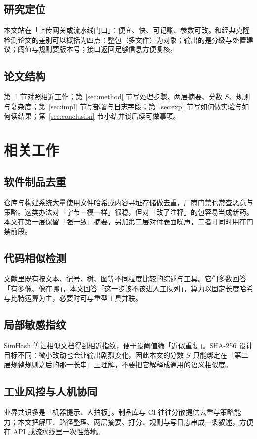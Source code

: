 \documentclass[UTF8,a4paper,zihao=5]{ctexart}
\begin{document}
\subsection{研究定位}
本文站在「上传网关或流水线门口」：便宜、快、可记账、参数可改。和经典克隆检测论文的差别可以概括为四点：整包（多文件）为对象；输出的是分级与处置建议；阈值与规则要版本号；接口返回足够信息方便复核。

\subsection{论文结构}
第~\ref{sec:related} 节对照相近工作；第~\ref{sec:method} 节写处理步骤、两层摘要、分数 $S$、规则与复杂度；第~\ref{sec:impl} 节写部署与日志字段；第~\ref{sec:exp} 节写如何做实验与如何读结果；第~\ref{sec:conclusion} 节小结并谈后续可做事项。

\section{相关工作}
\label{sec:related}

\subsection{软件制品去重}
仓库与构建系统大量使用文件哈希或内容寻址存储做去重\cite{swh2020}，厂商门禁也常查恶意与策略。这类办法对「字节一模一样」很稳，但对「改了注释」的包容易当成新药。本文在第一层保留「强一致」摘要，另加第二层对付表面噪声，二者可同时用在门禁前段。

\subsection{代码相似检测}
文献里既有按文本、记号、树、图等不同粒度比较的综述与工具\cite{mdpi2023review,moss,winnowing2003,ccfinder,deckard}。它们多数回答「有多像、像在哪」，本文回答「这一步该不该进人工队列」，算力以固定长度哈希与比特运算为主，必要时可与重型工具并联。

\subsection{局部敏感指纹}
SimHash 等让相似文档得到相近指纹，便于设阈值筛「近似重复」\cite{simhash2006}。SHA-256 设计目标不同：微小改动也会让输出剧烈变化，因此本文的分数 $S$ 只能绑定在「第二层规整规则之后的那一长串」上理解，不要把它解释成通用的语义相似度。

\subsection{工业风控与人机协同}
业界共识多是「机器提示、人拍板」\cite{moss,novak2019}。制品库与 CI 往往分散提供去重与策略能力；本文把解压、路径整理、两层摘要、打分、规则与写日志串成一条叙述，方便在 API 或流水线里一次性落地。
\end{document}
